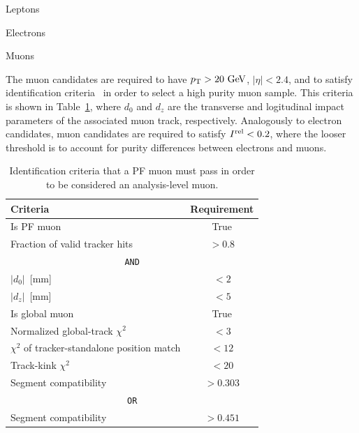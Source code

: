 \begin{section}{Leptons}
\begin{subsection}{Electrons}
\end{subsection}

\begin{subsection}{Muons}

The muon candidates are required to have $p_{\mathrm{T}} > 20~\mathrm{Ge\kern -0.1em V}$, $|\eta| < 2.4$, and to satisfy identification criteria~\cite{muon_id} in order to select a high purity muon sample.
This criteria is shown in Table~\ref{tab:muon_id}, where $d_0$ and $d_z$ are the transverse and logitudinal impact parameters of the associated muon track, respectively.
Analogously to electron candidates, muon candidates are required to satisfy $I^{\mathrm{rel}} < 0.2$, where the looser threshold is to account for purity differences between electrons and muons.

\begin{table}[tb!]
\centering
\begin{tabular}{l|c}
\hline \hline
Criteria                                       &  Requirement \\
\hline
Is PF muon                                     &  True        \\
Fraction of valid tracker hits                 &  $> 0.8$     \\
\hline
\multicolumn{2}{c}{\texttt{AND}}                              \\      
$|d_0|$~[mm]                                   &  $< 2$       \\
$|d_z|$~[mm]                                   &  $< 5$       \\
Is global muon                                 &  True        \\
Normalized global-track $\chi^2$               &  $< 3$       \\
$\chi^2$ of tracker-standalone position match  &  $< 12$      \\
Track-kink $\chi^2$                            &  $< 20$      \\
Segment compatibility                          &  $> 0.303$   \\
\multicolumn{2}{c}{\texttt{OR}}                               \\
Segment compatibility                          &  $> 0.451$   \\
\hline\hline
\end{tabular}
\caption{Identification criteria that a PF muon must pass in order to be considered an analysis-level muon.}
\label{tab:muon_id}
\end{table}


\end{subsection}
\end{section}
